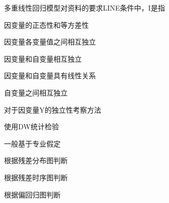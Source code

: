 \par\addvspace{6pt}\noindent\begin{minipage}{\linewidth}


多重线性回归模型对资料的要求LINE条件中，I是指


\begin{choices}

\item 因变量的正态性和等方差性

\item 因变量各变量值之间相互独立

\item 因变量和自变量相互独立

\item 因变量和自变量具有线性关系

\item 自变量之间相互独立

\end{choices}

\end{minipage}\par\vspace{4pt}

\par\addvspace{6pt}\noindent\begin{minipage}{\linewidth}


对于因变量Y的独立性考察方法


\begin{choices}

\item 使用DW统计检验

\item 一般基于专业假定

\item 根据残差分布图判断

\item 根据残差时序图判断

\item 根据偏回归图判断

\end{choices}

\end{minipage}\par\vspace{4pt}

